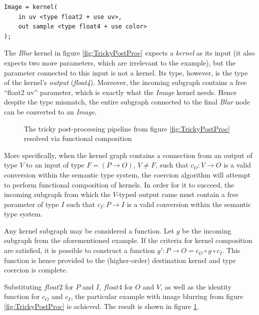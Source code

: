 \begin{lstlisting}[frame=single]
Image = kernel(
    in uv <type float2 + use uv>,
    out sample <type float4 + use color>
);
\end{lstlisting}

The \emph{Blur} kernel in figure \ref{fig:TrickyPostProc} expects a \emph{kernel} as its input (it also expects two more parameters, which are irrelevant to the example), but the parameter connected to this input is not a kernel. Its type, however, is the type of the kernel's \emph{output} (\emph{float4}). Moreover, the incoming subgraph contains a free ``float2 uv'' parameter, which is exactly what the \emph{Image} kernel needs. Hence despite the type mismatch, the entire subgraph connected to the final \emph{Blur} node can be converted to an \emph{Image}.

\begin{figure}[h!]
  \centering
    \caption[The tricky post-processing pipeline resolved]{The tricky post-processing pipeline from figure \ref{fig:TrickyPostProc} resolved via functional composition}
  \label{fig:TrickyPostProcResolve}
\end{figure}

More specifically, when the kernel graph contains a connection from an output of type $V$ to an input of type $F = (P \rightarrow O)$, $V \neq F$, such that $c_O : V \rightarrow O$ is a valid conversion within the semantic type system, the coercion algorithm will attempt to perform functional composition of kernels. In order for it to succeed, the incoming subgraph from which the $V$-typed output came must contain a free parameter of type $I$ such that $c_I : P \rightarrow I$ is a valid conversion within the semantic type system.

Any kernel subgraph may be considered a function. Let $g$ be the incoming subgraph from the aforementioned example. If the criteria for kernel composition are satisfied, it is possible to construct a function $g\prime : P \rightarrow O = c_O \circ g \circ c_I$. This function is hence provided to the (higher-order) destination kernel and type coercion is complete.

Substituting $float2$ for $P$ and $I$, $float4$ for $O$ and $V$, as well as the identity function for $c_O$ and $c_I$, the particular example with image blurring from figure \ref{fig:TrickyPostProc} is achieved. The result is shown in figure \ref{fig:TrickyPostProcResolve}.

